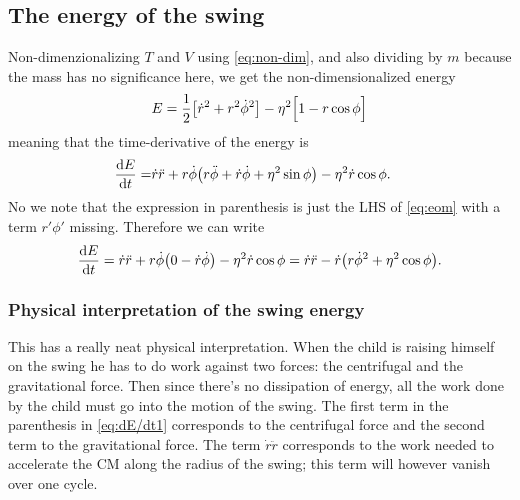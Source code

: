 \documentclass[11pt,letter, swedish, english,%
]{article}
\begin{document}
\subsection{The energy of the swing}
Non-dimenzionalizing $T$ and $V$ using \eqref{eq:non-dim}, %
and also dividing by $m$ because the mass has no significance here, we
get the non-dimensionalized energy  
\begin{equation}\label{eq:E}
E=\frac{1}{2}\qty[\dot{r}^2 + {r}^2\dot{\phi}^2] 
-\eta^2\Big[1-r\cos\phi\Big] 
\end{equation}
meaning that the time-derivative of the energy is
\begin{equation}
\begin{aligned}
\dv{E}{t}
=&\dot{r}\ddot{r}+r\dot\phi\qty(r\ddot\phi + \dot{r}\dot\phi + \eta^2\sin\phi) 
-\eta^2\dot{r}\cos\phi.
\end{aligned}
\end{equation}
No we note that the expression in parenthesis is just the LHS of
\eqref{eq:eom} with a term $r'\phi'$ missing. Therefore we can write
\begin{equation}\label{eq:dE/dt1}
\dv{E}{t}
=\dot{r}\ddot{r}+r\dot\phi\qty(0-\dot{r}\dot\phi)-\eta^2\dot{r}\cos\phi
=\dot{r}\ddot{r} - \dot{r}\qty(r\dot{\phi}^2 + \eta^2\cos\phi).
\end{equation}





\subsubsection{Physical interpretation of the swing energy}
\label{sec:phys_interp}
This has a really neat physical interpretation. When the child is
raising himself on the swing he has to do work against two forces:
the centrifugal and the gravitational force. Then since there's no
dissipation of energy, all the work done by the child must go into the
motion of the swing. 
The first term in the parenthesis in \eqref{eq:dE/dt1} corresponds
to the centrifugal force and the second term to the gravitational
force.
The term $\dot{r}\ddot{r}$ corresponds to the work needed to
accelerate the CM along the radius of the swing; this term will
however 
vanish over one cycle.\footnotemark{}  
\end{document}
